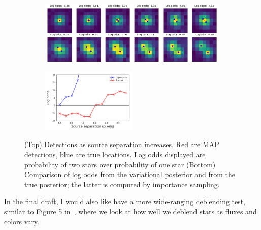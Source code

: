 \begin{figure}[!h]
    \centering
    \begin{subfigure}[t]{\textwidth}
    \centering
    \includegraphics[width=\textwidth]{figures/deblending_ex.png}
    \end{subfigure}
    \begin{subfigure}[t]{\textwidth}
    \centering
    \includegraphics[width=0.5\textwidth]{figures/deblending_is_compare.png}
    \end{subfigure}
    \vspace{-3em}
    \caption{(Top) Detections as source separation increases. Red are MAP detections, blue are true locations. Log odds displayed are probability of two stars over probability of one star (Bottom) Comparison of log odds from the variational posterior and from the true posterior; the latter is computed by importance sampling. }
    \label{fig:deblending_test}
\end{figure}


In the final draft, I would also like have a more wide-ranging deblending test, similar to Figure 5 in~\cite{Feder_2019}, where we look at how well we deblend stars as fluxes and colors vary. 
